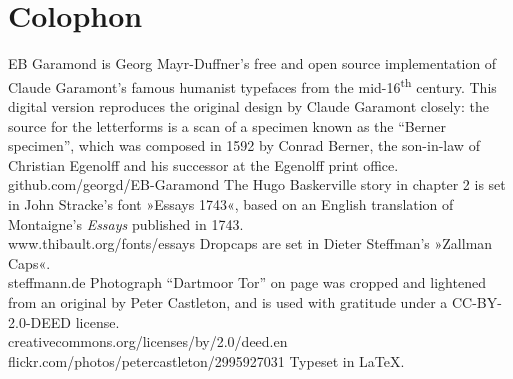 \documentclass[
paper=5.5in:8.5in,
BCOR=7mm,
twoside,
DIV=calc,
11pt,
usegeometry,
chapterprefix,
endperiod,
headings=big]{scrbook} %
\def\picsize{\textwidth}
\def\picsize{\textwidth}
\begin{document}
%
%
%
%
%

\chapter*{Colophon}

\centering

EB Garamond is Georg Mayr-Duffner's free and open source implementation of Claude Garamont’s famous humanist typefaces from the mid-16\textsuperscript{th} century. This digital version reproduces the original design by Claude Garamont closely: the source for the letterforms is a scan of a specimen known as the \enquote{Berner specimen}, which was composed in 1592 by Conrad Berner, the son-in-law of Christian Egenolff and his successor at the Egenolff print office. \\
github.com/georgd/EB-Garamond
\vfill
The Hugo Baskerville story in chapter 2 is set in John Stracke's font »Essays 1743«, based on an English translation of Montaigne's \textit{Essays} published in 1743.\\
www.thibault.org/fonts/essays
\vfill
Dropcaps are set in Dieter Steffman's »Zallman Caps«.\\steffmann.de
\vfill
Photograph \enquote{Dartmoor Tor} on page \pageref{tor} was cropped and lightened from an original by Peter Castleton, and is used with gratitude under a CC-BY-2.0-DEED license. \\
creativecommons.org/licenses/by/2.0/deed.en\\
flickr.com/photos/petercastleton/2995927031
\vfill
Typeset in \LaTeX{}.
\thispagestyle{empty}
\end{document}
